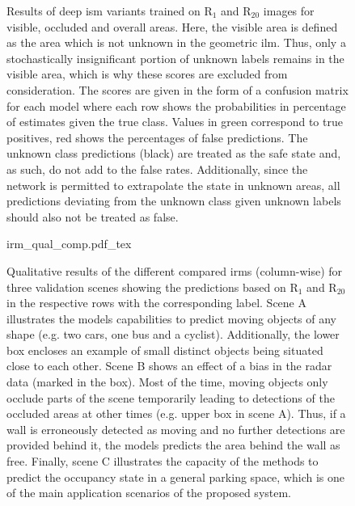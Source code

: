\begin{figure}[H]
	\caption{\label{tab:deep_ism_r20_results}Results of deep \gls{ism} variants trained on R$_1$ and R$_{20}$ images for visible, occluded and overall areas. Here, the visible area is defined as the area which is not unknown in the geometric \gls{ilm}. Thus, only a stochastically insignificant portion of unknown labels remains in the visible area, which is why these scores are excluded from consideration. The scores are given in the form of a confusion matrix for each model where each row shows the probabilities in percentage of estimates given the true class. Values in green correspond to true positives, red shows the percentages of false predictions. The unknown class predictions (black) are treated as the safe state and, as such, do not add to the false rates. Additionally, since the network is permitted to extrapolate the state in unknown areas, all predictions deviating from the unknown class given unknown labels should also not be treated as false.}
\end{figure} 
\begin{figure}[H]
	\begin{center}
		{irm_qual_comp.pdf_tex}
		\caption{\label{fig:irm_qual_comp}Qualitative results of the different compared \gls{irm}s (column-wise) for three validation scenes showing the predictions based on R$_1$ and R$_{20}$ in the respective rows with the corresponding label. Scene A illustrates the models capabilities to predict moving objects of any shape (e.g. two cars, one bus and a cyclist). Additionally, the lower box encloses an example of small distinct objects being situated close to each other. Scene B shows an effect of a bias in the radar data (marked in the box). Most of the time, moving objects only occlude parts of the scene temporarily leading to detections of the occluded areas at other times (e.g. upper box in scene A). Thus, if a wall is erroneously detected as moving and no further detections are provided behind it, the models predicts the area behind the wall as free. Finally, scene C illustrates the capacity of the methods to predict the occupancy state in a general parking space, which is one of the main application scenarios of the proposed system.}
	\end{center}
\end{figure}
%
